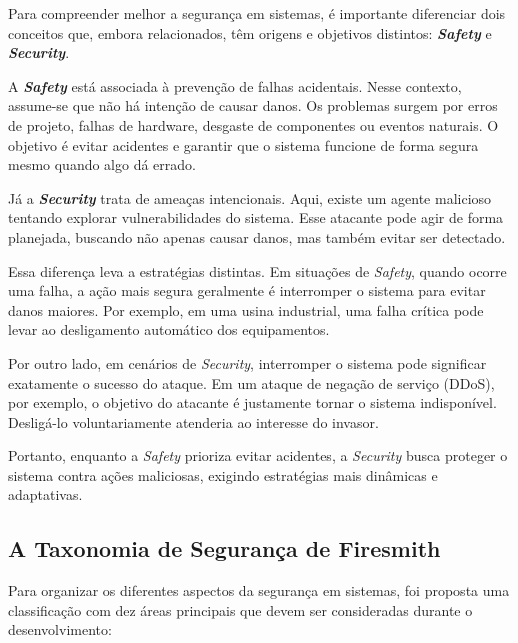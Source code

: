 \documentclass[12pt,a4paper,twoside]{report}
\begin{document}
Para compreender melhor a segurança em sistemas, é importante diferenciar dois conceitos que, embora relacionados, têm origens e objetivos distintos: \textbf{\textit{Safety}} e \textbf{\textit{Security}}.

A \textbf{\textit{Safety}} está associada à prevenção de falhas acidentais. Nesse contexto, assume-se que não há intenção de causar danos. Os problemas surgem por erros de projeto, falhas de hardware, desgaste de componentes ou eventos naturais. O objetivo é evitar acidentes e garantir que o sistema funcione de forma segura mesmo quando algo dá errado.

Já a \textbf{\textit{Security}} trata de ameaças intencionais. Aqui, existe um agente malicioso tentando explorar vulnerabilidades do sistema. Esse atacante pode agir de forma planejada, buscando não apenas causar danos, mas também evitar ser detectado.

Essa diferença leva a estratégias distintas. Em situações de \textit{Safety}, quando ocorre uma falha, a ação mais segura geralmente é interromper o sistema para evitar danos maiores. Por exemplo, em uma usina industrial, uma falha crítica pode levar ao desligamento automático dos equipamentos.

Por outro lado, em cenários de \textit{Security}, interromper o sistema pode significar exatamente o sucesso do ataque. Em um ataque de negação de serviço (DDoS), por exemplo, o objetivo do atacante é justamente tornar o sistema indisponível. Desligá-lo voluntariamente atenderia ao interesse do invasor.

Portanto, enquanto a \textit{Safety} prioriza evitar acidentes, a \textit{Security} busca proteger o sistema contra ações maliciosas, exigindo estratégias mais dinâmicas e adaptativas.

\subsection{A Taxonomia de Segurança de Firesmith}

Para organizar os diferentes aspectos da segurança em sistemas, foi proposta uma classificação com dez áreas principais que devem ser consideradas durante o desenvolvimento:
\end{document}

